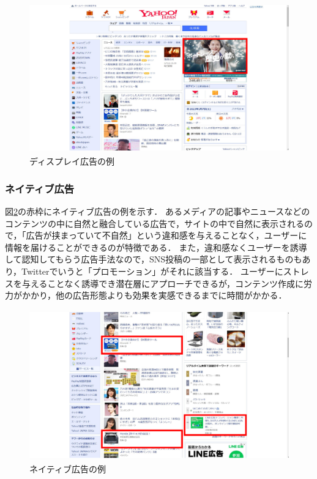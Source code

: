 \documentclass[12pt,a4j,titlepage]{ltjsarticle}
\begin{document}
\begin{figure}[H]
\begin{center}
 \includegraphics[height=65mm]{figures/ディスプレイ広告.pdf}
\end{center}
 \caption{ディスプレイ広告の例}
 \label{fig:ディスプレイ広告}
\end{figure}

\subsubsection{ネイティブ広告}
図\ref{fig:ネイティブ広告}の赤枠にネイティブ広告の例を示す．
あるメディアの記事やニュースなどのコンテンツの中に自然と融合している広告で，サイトの中で自然に表示されるので，「広告が挟まっていて不自然」という違和感を与えることなく，ユーザーに情報を届けることができるのが特徴である\cite{native}．
また，違和感なくユーザーを誘導して認知してもらう広告手法なので，SNS投稿の一部として表示されるものもあり，Twitterでいうと「プロモーション」がそれに該当する．
ユーザーにストレスを与えることなく誘導でき潜在層にアプローチできるが，コンテンツ作成に労力がかかり，他の広告形態よりも効果を実感できるまでに時間がかかる．

\begin{figure}[H]
\begin{center}
 \includegraphics[height=65mm]{figures/ネイティブ広告.pdf}
\end{center}
 \caption{ネイティブ広告の例}
 \label{fig:ネイティブ広告}
\end{figure}
\end{document}

